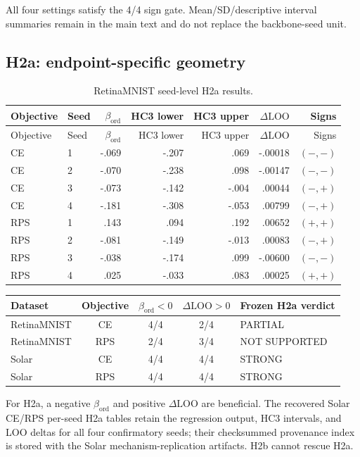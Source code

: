 All four settings satisfy the 4/4 sign gate. Mean/SD/descriptive interval
summaries remain in the main text and do not replace the backbone-seed unit.

\subsection{H2a: endpoint-specific geometry}

\begin{longtable}{llrrrrr}
\caption{RetinaMNIST seed-level H2a results.}\label{tab:supp-h2a-retina}\\
\toprule
Objective & Seed & $\beta_{\mathrm{ord}}$ & HC3 lower & HC3 upper & $\Delta\mathrm{LOO}$ & Signs \\
\midrule
\endfirsthead
\toprule
Objective & Seed & $\beta_{\mathrm{ord}}$ & HC3 lower & HC3 upper & $\Delta\mathrm{LOO}$ & Signs \\
\midrule
\endhead
CE & 1 & -.069 & -.207 & .069 & -.00018 & $(-,-)$ \\
CE & 2 & -.070 & -.238 & .098 & -.00147 & $(-,-)$ \\
CE & 3 & -.073 & -.142 & -.004 & .00044 & $(-,+)$ \\
CE & 4 & -.181 & -.308 & -.053 & .00799 & $(-,+)$ \\
RPS & 1 & .143 & .094 & .192 & .00652 & $(+,+)$ \\
RPS & 2 & -.081 & -.149 & -.013 & .00083 & $(-,+)$ \\
RPS & 3 & -.038 & -.174 & .099 & -.00600 & $(-,-)$ \\
RPS & 4 & .025 & -.033 & .083 & .00025 & $(+,+)$ \\
\bottomrule
\end{longtable}

\begin{center}
\begin{tabular}{lcccl}
\toprule
Dataset & Objective & $\beta_{\mathrm{ord}}<0$ & $\Delta\mathrm{LOO}>0$ & Frozen H2a verdict \\
\midrule
RetinaMNIST & CE & 4/4 & 2/4 & PARTIAL \\
RetinaMNIST & RPS & 2/4 & 3/4 & NOT SUPPORTED \\
Solar & CE & 4/4 & 4/4 & STRONG \\
Solar & RPS & 4/4 & 4/4 & STRONG \\
\bottomrule
\end{tabular}
\end{center}

For H2a, a negative \(\beta_{\mathrm{ord}}\) and positive
\(\Delta\mathrm{LOO}\) are beneficial. The recovered Solar CE/RPS per-seed
H2a tables retain the regression output, HC3 intervals, and LOO deltas for all
four confirmatory seeds; their checksummed provenance index is stored with the
Solar mechanism-replication artifacts. H2b cannot rescue H2a.
